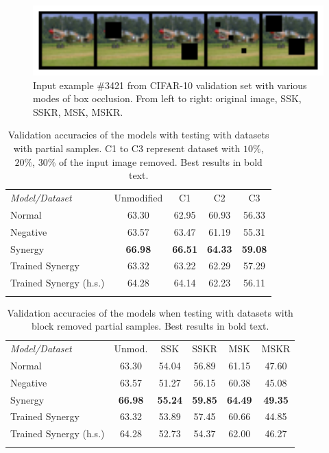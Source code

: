 \documentclass[b5paper]{book}
\begin{document}
\begin{figure}
    \centering
    \includegraphics[width=1\textwidth]{figures/fig4.png}
\caption{Input example \#3421 from CIFAR-10 validation set with various modes of box occlusion. From left to right: original image, SSK, SSKR, MSK, MSKR.}
\label{fig:4} 
\end{figure}

\begin{table}
\centering
\caption{Validation accuracies of the models with testing with datasets with partial samples. C1 to C3 represent dataset with \( 10\% \), \( 20\% \), \( 30\% \) of the input image removed. Best results in bold text.}
\label{tab:8}
\tabcolsep=0.06cm
\begin{tabular}{lcccc}
\hline\noalign{\smallskip}
\emph{Model/Dataset} & Unmodified & C1 & C2 & C3 \\
\noalign{\smallskip}\hline\noalign{\smallskip}
Normal & 63.30 & 62.95 & 60.93 & 56.33 \\
Negative & 63.57 & 63.47 & 61.19 & 55.31 \\
Synergy & \textbf{66.98} & \textbf{66.51} & \textbf{64.33} & \textbf{59.08}\\
Trained Synergy & 63.32 & 63.22 & 62.29 & 57.29\\
Trained Synergy (h.s.) & 64.28 & 64.14 & 62.23 & 56.11\\
\noalign{\smallskip}\hline
\end{tabular}
\end{table}

\begin{table}
\centering
\caption{Validation accuracies of the models when testing with datasets with block removed partial samples. Best results in bold text.}
\label{tab:9}
\tabcolsep=0.06cm
\begin{tabular}{lccccc}
\hline\noalign{\smallskip}
\emph{Model/Dataset} & Unmod. & SSK & SSKR & MSK & MSKR \\
\noalign{\smallskip}\hline\noalign{\smallskip}
Normal & 63.30 & 54.04 & 56.89 & 61.15 & 47.60 \\
Negative & 63.57 & 51.27 & 56.15 & 60.38 & 45.08 \\
Synergy & \textbf{66.98} & \textbf{55.24} & \textbf{59.85} & \textbf{64.49} & \textbf{49.35}\\
Trained Synergy & 63.32 & 53.89 & 57.45 & 60.66 & 44.85\\
Trained Synergy (h.s.) & 64.28 & 52.73 & 54.37 & 62.00 & 46.27 \\
\noalign{\smallskip}\hline
\end{tabular}
\end{table}
\end{document}
